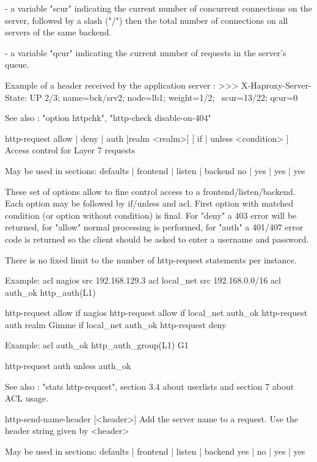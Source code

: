     - a variable "scur" indicating the current number of concurrent connections
      on the server, followed by a slash ("/") then the total number of
      connections on all servers of the same backend.

    - a variable "qcur" indicating the current number of requests in the
      server's queue.

  Example of a header received by the application server :
    >>>  X-Haproxy-Server-State: UP 2/3; name=bck/srv2; node=lb1; weight=1/2; \
           scur=13/22; qcur=0

  See also : "option httpchk", "http-check disable-on-404"

http-request { allow | deny | auth [realm <realm>] }
             [ { if | unless } <condition> ]
  Access control for Layer 7 requests

  May be used in sections:   defaults | frontend | listen | backend
                                no    |    yes   |   yes  |   yes

  These set of options allow to fine control access to a
  frontend/listen/backend. Each option may be followed by if/unless and acl.
  First option with matched condition (or option without condition) is final.
  For "deny" a 403 error will be returned, for "allow" normal processing is
  performed, for "auth" a 401/407 error code is returned so the client
  should be asked to enter a username and password.

  There is no fixed limit to the number of http-request statements per
  instance.

  Example:
        acl nagios src 192.168.129.3
        acl local_net src 192.168.0.0/16
        acl auth_ok http_auth(L1)

        http-request allow if nagios
        http-request allow if local_net auth_ok
        http-request auth realm Gimme if local_net auth_ok
        http-request deny

  Example:
        acl auth_ok http_auth_group(L1) G1

        http-request auth unless auth_ok

  See also : "stats http-request", section 3.4 about userlists and section 7
             about ACL usage.

http-send-name-header [<header>]
  Add the server name to a request. Use the header string given by <header>

  May be used in sections:   defaults | frontend | listen | backend
                               yes    |    no    |   yes  |   yes

